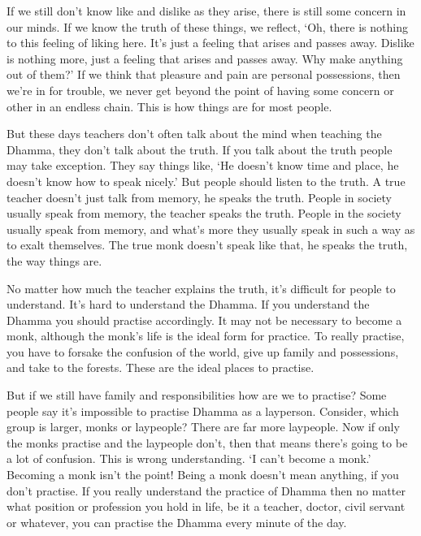 If we still don't know like and dislike as they arise, there is still some concern in our minds. If we know the truth of these things, we reflect, `Oh, there is nothing to this feeling of liking here. It's just a feeling that arises and passes away. Dislike is nothing more, just a feeling that arises and passes away. Why make anything out of them?' If we think that pleasure and pain are personal possessions, then we're in for trouble, we never get beyond the point of having some concern or other in an endless chain. This is how things are for most people.

But these days teachers don't often talk about the mind when teaching the Dhamma, they don't talk about the truth. If you talk about the truth people may take exception. They say things like, `He doesn't know time and place, he doesn't know how to speak nicely.' But people should listen to the truth. A true teacher doesn't just talk from memory, he speaks the truth. People in society usually speak from memory, the teacher speaks the truth. People in the society usually speak from memory, and what's more they usually speak in such a way as to exalt themselves. The true monk doesn't speak like that, he speaks the truth, the way things are.

No matter how much the teacher explains the truth, it's difficult for people to understand. It's hard to understand the Dhamma. If you understand the Dhamma you should practise accordingly. It may not be necessary to become a monk, although the monk's life is the ideal form for practice. To really practise, you have to forsake the confusion of the world, give up family and possessions, and take to the forests. These are the ideal places to practise.

But if we still have family and responsibilities how are we to practise? Some people say it's impossible to practise Dhamma as a layperson. Consider, which group is larger, monks or laypeople? There are far more laypeople. Now if only the monks practise and the laypeople don't, then that means there's going to be a lot of confusion. This is wrong understanding. `I can't become a monk.' Becoming a monk isn't the point! Being a monk doesn't mean anything, if you don't practise. If you really understand the practice of Dhamma then no matter what position or profession you hold in life, be it a teacher, doctor, civil servant or whatever, you can practise the Dhamma every minute of the day.

